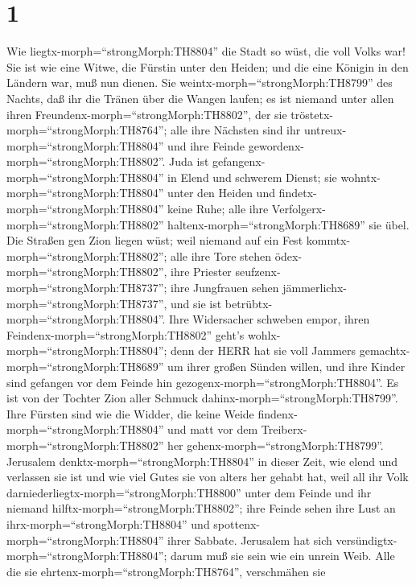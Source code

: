 \hypertarget{section}{%
\section{1}\label{section}}

 Wie liegtx-morph=``strongMorph:TH8804'' die Stadt so wüst,
die voll Volks war! Sie ist wie eine Witwe, die Fürstin unter den
Heiden; und die eine Königin in den Ländern war, muß nun dienen.
 Sie weintx-morph=``strongMorph:TH8799'' des Nachts, daß ihr
die Tränen über die Wangen laufen; es ist niemand unter allen ihren
Freundenx-morph=``strongMorph:TH8802'', der sie
tröstetx-morph=``strongMorph:TH8764''; alle ihre Nächsten sind ihr
untreux-morph=``strongMorph:TH8804'' und ihre Feinde
gewordenx-morph=``strongMorph:TH8802''.  Juda ist
gefangenx-morph=``strongMorph:TH8804'' in Elend und schwerem Dienst; sie
wohntx-morph=``strongMorph:TH8804'' unter den Heiden und
findetx-morph=``strongMorph:TH8804'' keine Ruhe; alle ihre
Verfolgerx-morph=``strongMorph:TH8802''
haltenx-morph=``strongMorph:TH8689'' sie übel.  Die Straßen
gen Zion liegen wüst; weil niemand auf ein Fest
kommtx-morph=``strongMorph:TH8802''; alle ihre Tore stehen
ödex-morph=``strongMorph:TH8802'', ihre Priester
seufzenx-morph=``strongMorph:TH8737''; ihre Jungfrauen sehen
jämmerlichx-morph=``strongMorph:TH8737'', und sie ist
betrübtx-morph=``strongMorph:TH8804''.  Ihre Widersacher
schweben empor, ihren Feindenx-morph=``strongMorph:TH8802'' geht's
wohlx-morph=``strongMorph:TH8804''; denn der HERR hat sie voll Jammers
gemachtx-morph=``strongMorph:TH8689'' um ihrer großen Sünden willen, und
ihre Kinder sind gefangen vor dem Feinde hin
gezogenx-morph=``strongMorph:TH8804''.  Es ist von der
Tochter Zion aller Schmuck dahinx-morph=``strongMorph:TH8799''. Ihre
Fürsten sind wie die Widder, die keine Weide
findenx-morph=``strongMorph:TH8804'' und matt vor dem
Treiberx-morph=``strongMorph:TH8802'' her
gehenx-morph=``strongMorph:TH8799''.  Jerusalem
denktx-morph=``strongMorph:TH8804'' in dieser Zeit, wie elend und
verlassen sie ist und wie viel Gutes sie von alters her gehabt hat, weil
all ihr Volk darniederliegtx-morph=``strongMorph:TH8800'' unter dem
Feinde und ihr niemand hilftx-morph=``strongMorph:TH8802''; ihre Feinde
sehen ihre Lust an ihrx-morph=``strongMorph:TH8804'' und
spottenx-morph=``strongMorph:TH8804'' ihrer Sabbate. 
Jerusalem hat sich versündigtx-morph=``strongMorph:TH8804''; darum muß
sie sein wie ein unrein Weib. Alle die sie
ehrtenx-morph=``strongMorph:TH8764'', verschmähen sie
